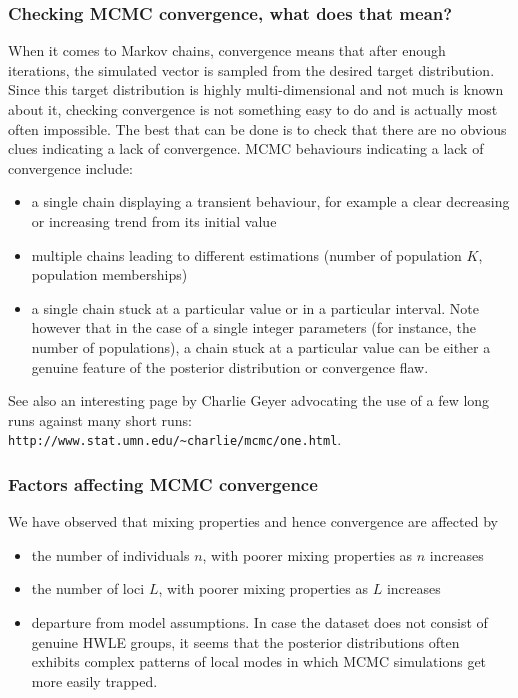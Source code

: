 \documentclass{article}
\begin{document}
\subsubsection{Checking MCMC convergence, what does that mean?}

When it comes to Markov chains, convergence means that after enough iterations, the simulated vector is sampled from the 
desired target distribution. 
Since this target distribution is highly multi-dimensional and not much is known about it, checking convergence is not something easy to do 
and is actually most often impossible. 
The best that can be done is to check that there are no obvious clues indicating a lack of convergence. 
MCMC behaviours indicating a lack of convergence include:

\begin{itemize}
\item a single chain displaying a transient behaviour, for example a clear decreasing or increasing trend from its initial value 
\item multiple chains leading to different estimations (number of population $K$, population memberships)
\item a single chain stuck at a particular value or in a particular interval. Note however that in the case of a single integer parameters 
(for instance, the number of populations), a chain stuck at a particular value can be either a genuine feature of the posterior distribution 
or convergence flaw.
\end{itemize} 


See also an interesting page by Charlie Geyer advocating the use of a few long runs against many short runs:
\texttt{http://www.stat.umn.edu/\~{ }charlie/mcmc/one.html}.

\subsubsection{Factors affecting MCMC convergence}\label{sec:fact_MCMC_conv}

We have observed that mixing properties and hence convergence are affected by 

\begin{itemize}
\item the number of individuals $n$,  with poorer mixing properties as $n$ increases 
\item the number of loci $L$, with poorer mixing properties as $L$ increases 
\item departure from model assumptions. In case the dataset does not consist of genuine HWLE groups, it seems 
that the posterior distributions often exhibits  complex patterns of local modes in which MCMC simulations 
get more easily trapped. 
\end{itemize} 
\end{document}

